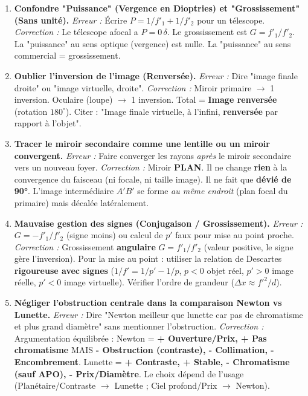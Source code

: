 \documentclass[11pt]{article}
\begin{document}
\begin{attention}
\begin{enumerate}
    \item \textbf{Confondre "Puissance" (Vergence en Dioptries) et "Grossissement" (Sans unité).}
    \emph{Erreur :} Écrire $P = 1/f'_1 + 1/f'_2$ pour un télescope.
    \emph{Correction :} Le télescope afocal a $P=0\,\delta$. Le grossissement est $G = f'_1/f'_2$. La "puissance" au sens optique (vergence) est nulle. La "puissance" au sens commercial = grossissement.
    \item \textbf{Oublier l'inversion de l'image (Renversée).}
    \emph{Erreur :} Dire "image finale droite" ou "image virtuelle, droite".
    \emph{Correction :} Miroir primaire $\rightarrow$ 1 inversion. Oculaire (loupe) $\rightarrow$ 1 inversion. Total = \textbf{Image renversée} (rotation $180^\circ$). Citer : "Image finale virtuelle, à l'infini, \textbf{renversée} par rapport à l'objet".
    \item \textbf{Tracer le miroir secondaire comme une lentille ou un miroir convergent.}
    \emph{Erreur :} Faire converger les rayons \emph{après} le miroir secondaire vers un nouveau foyer.
    \emph{Correction :} Miroir \textbf{PLAN}. Il ne change \textbf{rien} à la convergence du faisceau (ni focale, ni taille image). Il ne fait que \textbf{dévié de 90°}. L'image intermédiaire $A'B'$ se forme \emph{au même endroit} (plan focal du primaire) mais décalée latéralement.
    \item \textbf{Mauvaise gestion des signes (Conjugaison / Grossissement).}
    \emph{Erreur :} $G = -f'_1/f'_2$ (signe moins) ou calcul de $p'$ faux pour mise au point proche.
    \emph{Correction :} Grossissement \textbf{angulaire} $G = f'_1/f'_2$ (valeur positive, le signe gère l'inversion). Pour la mise au point : utiliser la relation de Descartes \textbf{rigoureuse avec signes} ($1/f' = 1/p' - 1/p$, $p<0$ objet réel, $p'>0$ image réelle, $p'<0$ image virtuelle). Vérifier l'ordre de grandeur ($\Delta x \approx f'^2/d$).
    \item \textbf{Négliger l'obstruction centrale dans la comparaison Newton vs Lunette.}
    \emph{Erreur :} Dire "Newton meilleur que lunette car pas de chromatisme et plus grand diamètre" sans mentionner l'obstruction.
    \emph{Correction :} Argumentation équilibrée : Newton = \textbf{+ Ouverture/Prix, + Pas chromatisme} MAIS \textbf{- Obstruction (contraste), - Collimation, - Encombrement}. Lunette = \textbf{+ Contraste, + Stable, - Chromatisme (sauf APO), - Prix/Diamètre}. Le choix dépend de l'usage (Planétaire/Contraste $\rightarrow$ Lunette ; Ciel profond/Prix $\rightarrow$ Newton).
\end{enumerate}
\end{attention}
\end{document}
